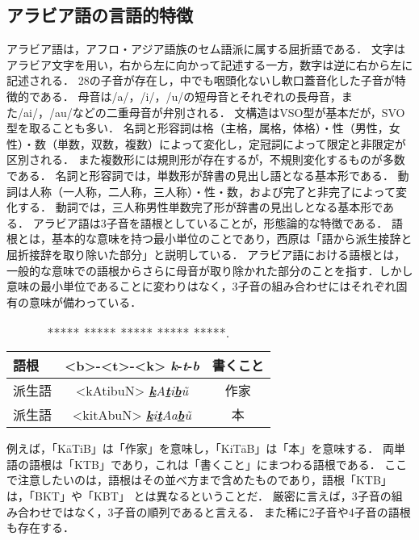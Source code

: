 \documentclass[technicalreport]{ieicej}
\begin{document}
\subsection{アラビア語の言語的特徴}
アラビア語は，アフロ・アジア語族のセム語派に属する屈折語である．
文字はアラビア文字を用い，右から左に向かって記述する一方，数字は逆に右から左に記述される．
28の子音が存在し，中でも咽頭化ないし軟口蓋音化した子音が特徴的である．
母音は/a/，/i/，/u/の短母音とそれぞれの長母音，また/ai/，/au/などの二重母音が弁別される．
文構造はVSO型が基本だが，SVO型を取ることも多い．
名詞と形容詞は格（主格，属格，体格）・性（男性，女性）・数（単数，双数，複数）によって変化し，定冠詞によって限定と非限定が区別される．
また複数形には規則形が存在するが，不規則変化するものが多数である．
名詞と形容詞では，単数形が辞書の見出し語となる基本形である．
動詞は人称（一人称，二人称，三人称）・性・数，および完了と非完了によって変化する．
動詞では，三人称男性単数完了形が辞書の見出しとなる基本形である．
アラビア語は3子音を語根としていることが，形態論的な特徴である．
語根とは，基本的な意味を持つ最小単位のことであり，西原\cite{nishihara2012}は「語から派生接辞と屈折接辞を取り除いた部分」と説明している．
アラビア語における語根とは，一般的な意味での語根からさらに母音が取り除かれた部分のことを指す．しかし意味の最小単位であることに変わりはなく，3子音の組み合わせにはそれぞれ固有の意味が備わっている．
\begin{table}[ht]
\begin{center}
\begin{tabular}{l|cc}
   語根& <b>-<t>-<k> \textit{\textbf{k}}-\textit{\textbf{t}}-\textit{\textbf{b}} & 書くこと\\
  \hline
 派生語& <kAtibuN>  \textit{\underline{\textbf{k}}A\underline{\textbf{t}}i\underline{\textbf{b}}\~u}& 作家\\
  派生語& <kitAbuN>  \textit{\underline{\textbf{k}}i\underline{\textbf{t}}Aa\underline{\textbf{b}}\~u} & 本\\
\hline
\end{tabular}
\caption{***** ***** ***** ***** *****.}
\label{table:alignment}
\end{center}
\end{table}
例えば，「KāTiB」は「作家」を意味し，「KiTāB」は「本」を意味する．
両単語の語根は「KTB」であり，これは「書くこと」にまつわる語根である．
ここで注意したいのは，語根はその並べ方まで含めたものであり，語根「KTB」は，「BKT」や「KBT」 とは異なるということだ．
厳密に言えば，3子音の組み合わせではなく，3子音の順列であると言える．
また稀に2子音や4子音の語根も存在する．
\end{document}
